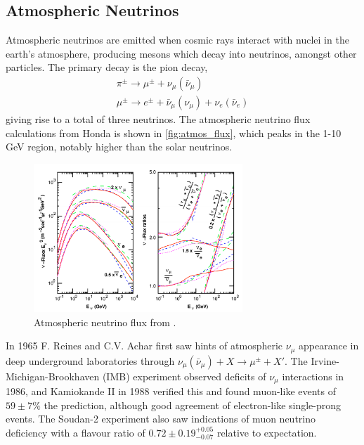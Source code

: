 \subsection{Atmospheric Neutrinos}
Atmospheric neutrinos are emitted when cosmic rays interact with nuclei in the earth's atmosphere, producing mesons which decay into neutrinos, amongst other particles. The primary decay is the pion decay,
\begin{gather*}
	\pi^\pm \rightarrow \mu^\pm + \nu_\mu(\bar{\nu}_\mu) \\
	\mu^\pm \rightarrow e^\pm + \bar{\nu}_\mu (\nu_\mu) + \nu_e (\bar{\nu}_e)
\end{gather*}
giving rise to a total of three neutrinos. The atmospheric neutrino flux calculations from Honda\cite{honda_flux} is shown in \autoref{fig:atmos_flux}, which peaks in the 1-10 GeV region, notably higher than the solar neutrinos.
\begin{figure}[h]
	\includegraphics[width=0.7\textwidth, trim={0mm 0mm 0mm 0mm}, clip,page=1]{figures/theory/honda_flux}
	\caption{Atmospheric neutrino flux from \cite{honda_flux}.}
	\label{fig:atmos_flux}
\end{figure}

In 1965 F. Reines\cite{reines_atmos} and C.V. Achar\cite{india_atmos_hint} first saw hints of atmospheric $\nu_\mu$ appearance in deep underground laboratories through $\nu_\mu(\bar{\nu}_\mu) + X \rightarrow \mu^\pm + X'$. The Irvine-Michigan-Brookhaven (IMB) experiment observed deficits of $\nu_\mu$ interactions in 1986\cite{imb}, and Kamiokande II in 1988\cite{kamiokande_atmos_hint} verified this and found muon-like events of $59\pm7\%$ the prediction, although good agreement of electron-like single-prong events. The Soudan-2 experiment\cite{soudan2} also saw indications of muon neutrino deficiency with a flavour ratio of $0.72\pm0.19^{+0.05}_{-0.07}$ relative to expectation. 

